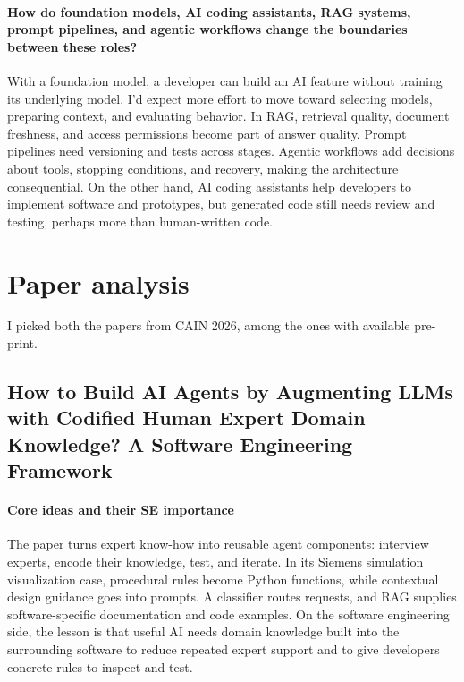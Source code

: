 \documentclass[11pt]{article}
\begin{document}
\paragraph{How do foundation models, AI coding assistants, RAG systems, prompt pipelines, and agentic workflows change the boundaries between these roles?}
With a foundation model, a developer can build an AI feature without training its underlying model. I'd expect more effort to move toward selecting models, preparing context, and evaluating behavior. In RAG, retrieval quality, document freshness, and access permissions become part of answer quality. Prompt pipelines need versioning and tests across stages. Agentic workflows add decisions about tools, stopping conditions, and recovery, making the architecture consequential.
On the other hand, AI coding assistants help developers to implement software and prototypes, but generated code still needs review and testing, perhaps more than human-written code.

\section{Paper analysis}

I picked both the papers from CAIN 2026, among the ones with available pre-print.\\

\subsection{How to Build AI Agents by Augmenting LLMs with Codified Human Expert Domain Knowledge? A Software Engineering Framework \cite{uulu2026buildaiagentsaugmenting}}

\paragraph{Core ideas and their SE importance}
The paper turns expert know-how into reusable agent components: interview experts, encode their knowledge, test, and iterate. In its Siemens simulation visualization case, procedural rules become Python functions, while contextual design guidance goes into prompts. A classifier routes requests, and RAG supplies software-specific documentation and code examples. On the software engineering side, the lesson is that useful AI needs domain knowledge built into the surrounding software to reduce repeated expert support and to give developers concrete rules to inspect and test.
\end{document}
